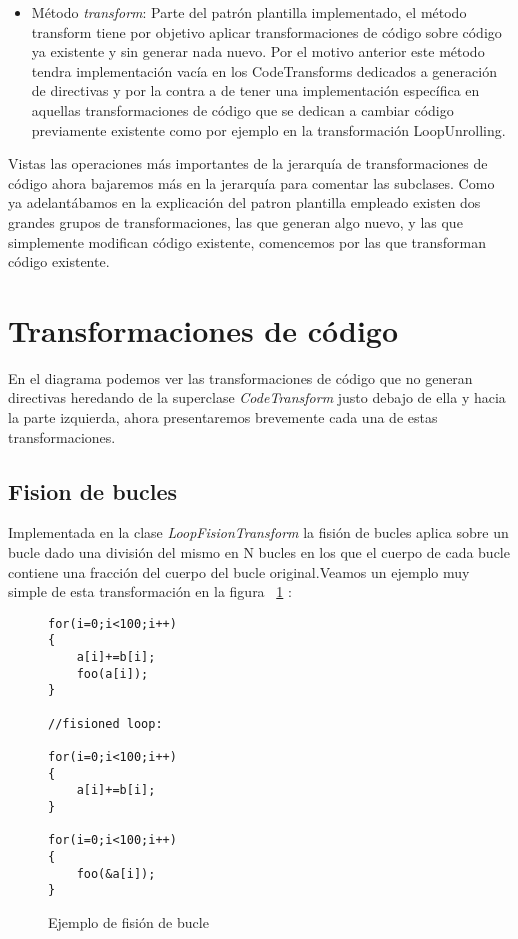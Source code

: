 \begin{itemize}
\item Método \textit{transform}: Parte del patrón plantilla implementado, el método transform tiene por objetivo aplicar transformaciones de código sobre código ya existente y sin generar nada nuevo. Por el motivo anterior este método tendra implementación vacía en los CodeTransforms dedicados a generación de directivas y por la contra a de tener una implementación específica en aquellas transformaciones de código que se dedican a cambiar código previamente existente como por ejemplo en la transformación LoopUnrolling.

\end{itemize}

Vistas las operaciones más importantes de la jerarquía de transformaciones de código ahora bajaremos más en la jerarquía para comentar las subclases. Como ya adelantábamos en la explicación del patron plantilla empleado existen dos grandes grupos de transformaciones, las que generan algo nuevo, y las que simplemente modifican código existente, comencemos por las que transforman código existente.

\section{Transformaciones de código}

En el diagrama podemos ver las transformaciones de código que no generan directivas heredando de la superclase \textit{CodeTransform} justo debajo de ella y hacia la parte izquierda, ahora presentaremos brevemente cada una de estas transformaciones.

\subsection{Fision de bucles}

Implementada en la clase \textit{LoopFisionTransform} la fisión de bucles aplica sobre un bucle dado una división del mismo en N bucles en los que el cuerpo de cada bucle contiene una fracción del cuerpo del bucle original.Veamos un ejemplo muy simple de esta transformación en la figura ~\ref{FIG:FisionExample} :

\begin{figure}[t]
\begin{lstlisting}
for(i=0;i<100;i++)
{
	a[i]+=b[i];
	foo(a[i]);
}

//fisioned loop:

for(i=0;i<100;i++)
{
	a[i]+=b[i];
}

for(i=0;i<100;i++)
{
	foo(&a[i]);
}
\end{lstlisting}
\caption{Ejemplo de fisión de bucle}
\label{FIG:FisionExample}
\end{figure}

